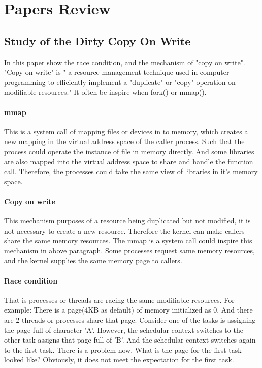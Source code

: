 \documentclass[12pt,a4paper,oneside]{IEEEconf}
\begin{document}
\section{Papers Review}
\subsection{Study of the Dirty Copy On Write}
In this paper\cite{Study_Dirty_Cow} show the race condition, and the mechanism of "copy on write".
"Copy on write" is " a resource-management technique used in computer programming to
efficiently implement a "duplicate" or "copy" operation on modifiable resources."
\cite{CoW_wiki} It often be inspire when fork() or mmap().

\paragraph{mmap}
This is a system call of mapping files or devices in to memory, which creates a
new mapping in the virtual address space of the caller process. Such that
the process could operate the instance of file in memory directly.
And some libraries are also mapped into the virtual address space to share and handle
the function call. Therefore, the processes could take the same view of libraries in
it's memory space.

\paragraph{Copy on write}
This mechanism purposes of a resource being duplicated but not modified, it is not
necessary to create a new resource. Therefore the kernel can make callers share
the same memory resources. The mmap is a system call could inspire this mechanism
in above paragraph. Some processes request same memory resources, and the kernel
supplies the same memory page to callers.

\paragraph{Race condition}
That is processes or threads are racing the same modifiable resources. For example:
There is a page(4KB as default) of memory initialized as 0. And there are 2 threads
or processes share that page. Consider one of the tasks is assigning the page full of
character 'A'. However, the schedular context switches to the other task assigns that
page full of 'B'. And the schedular context switches again to the first task.
There is a problem now. What is the page for the first task looked like? Obviously,
it does not meet the expectation for the first task.
\end{document}
